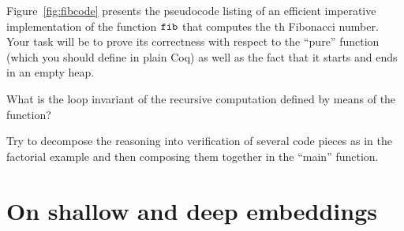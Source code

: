 \begin{exercise}
Figure~\ref{fig:fibcode} presents the pseudocode listing of an
efficient imperative implementation of the function $\mathtt{fib}$ that
computes the th Fibonacci number.  Your task will be to prove its
correctness with respect to the ``pure'' function  (which you
should define in plain Coq) as well as the fact that it starts and
ends in an empty heap.


\hint What is the loop invariant of the recursive computation
 defined by means of the  function?


\hint Try to decompose the reasoning into verification of several
 code pieces as in the factorial example and then composing them
 together in the ``main'' function.
\end{exercise}
\begin{coqdoccode}
\coqdocemptyline
\coqdocemptyline
\coqdocemptyline
\end{coqdoccode}
\section{On shallow and deep embeddings}


